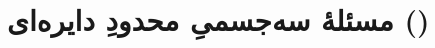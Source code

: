%
%
%
%
%
%
%
%






















\section{مسئلهٔ سه‌جسمیِ محدودِ دایره‌ای ()}\label{sec:crtbp}

